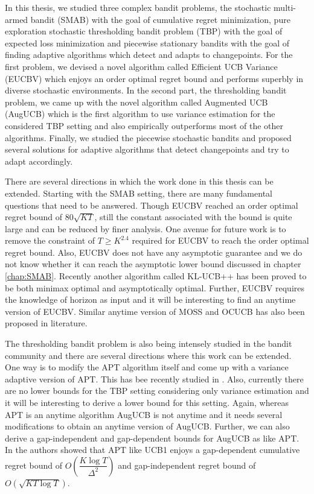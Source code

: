In this thesis, we studied three complex bandit problems, the stochastic multi-armed bandit (SMAB) with the goal of cumulative regret minimization, pure exploration stochastic thresholding bandit problem (TBP) with the goal of expected loss minimization and piecewise stationary bandits with the goal of finding adaptive algorithms which detect and adapts to changepoints. For the first problem, we devised a novel algorithm called Efficient UCB Variance (EUCBV) which enjoys an order optimal regret bound and performs superbly in diverse stochastic environments. In the second part, the thresholding bandit problem, we came up with the novel algorithm called Augmented UCB (AugUCB) which is the first algorithm to use variance estimation for the considered TBP setting and also empirically outperforms most of the other algorithms. Finally, we studied the piecewise stochastic bandits and proposed several solutions for adaptive algorithms that detect changepoints and try to adapt accordingly.

    There are several directions in which the work done in this thesis can be extended. Starting with the SMAB setting, there are many fundamental questions that need to be answered. Though EUCBV reached an order optimal regret bound of $80\sqrt{KT}$, still the constant associated with the bound is quite large and can be reduced by finer analysis. One avenue for future work is to remove the constraint of $T\geq K^{2.4}$ required for EUCBV to reach the order optimal regret bound. Also, EUCBV does not have any asymptotic guarantee and we do not know whether it can reach the \citet{lai1985asymptotically} asymptotic lower bound discussed in chapter \ref{chap:SMAB}. Recently another algorithm called KL-UCB++ \citep{menard2017minimax} has been proved to be both minimax optimal and asymptotically optimal. Further, EUCBV requires the knowledge of horizon as input and it will be interesting to find an anytime version of EUCBV. Similar anytime version of MOSS \citep{degenne2016anytime} and OCUCB \citep{lattimore2016regret} has also been proposed in literature.
    
    The thresholding bandit problem is also being intensely studied in the bandit community and there are several directions where this work can be extended. One way is to modify the APT algorithm itself and come up with a variance adaptive version of APT. This has bee recently studied in \citet{kano2017good}. Also, currently there are no lower bounds for the TBP setting considering only variance estimation and it will be interesting to derive a lower bound for this setting. Again, whereas APT is an anytime algorithm AugUCB is not anytime and it needs several modifications to obtain an anytime version of AugUCB. Further, we can also derive a gap-independent and gap-dependent bounds for AugUCB as like APT. In \citet{lattimore2015optimally} the authors showed that APT like UCB1 enjoys a gap-dependent cumulative regret bound of $O\left( \dfrac{K\log T}{\Delta^2}\right)$ and gap-independent regret bound of $O\left( \sqrt{KT\log T}\right)$.
    

